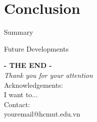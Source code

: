 \documentclass[aspectratio=169]{beamer}
\begin{document}
\section{Conclusion}
\begin{frame}{Summary}

\end{frame}


\begin{frame}{Future Developments}

\end{frame}


\begin{frame}
    \centering
    \vspace{1cm}
    \textbf{\Huge{- THE END - }}\\
    \vspace{0.2cm}
    \textit{\Large{Thank you for your attention}}\\
    \vspace{15pt}
    Acknowledgements:\\
    I want to...\\
    \vspace{20pt}
    Contact:\\
    youremail@hcmut.edu.vn
\end{frame}

%         
%         
\end{document}
